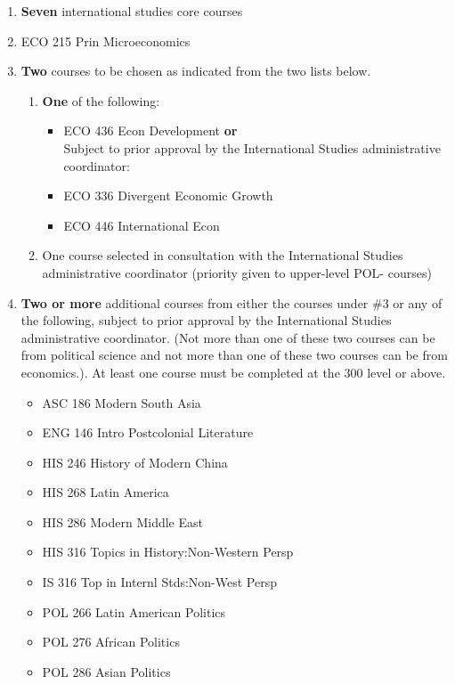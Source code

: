 \documentclass[
  letterpaper,
]{scrbook}
\providecommand{\tightlist}{%
  \setlength{\itemsep}{0pt}\setlength{\parskip}{0pt}}
\begin{document}
\begin{enumerate}
\def\labelenumi{\arabic{enumi}.}
\tightlist
\item
  \textbf{Seven} international studies core courses\\
\item
  ECO 215 Prin Microeconomics\\
\item
  \textbf{Two} courses to be chosen as indicated from the two lists
  below.

  \begin{enumerate}
  \def\labelenumii{\alph{enumii}.}
  \tightlist
  \item
    \textbf{One} of the following:

    \begin{itemize}
    \tightlist
    \item
      ECO 436 Econ Development \textbf{or}\\
      Subject to prior approval by the International Studies
      administrative coordinator:\\
    \item
      ECO 336 Divergent Economic Growth\\
    \item
      ECO 446 International Econ\\
    \end{itemize}
  \item
    One course selected in consultation with the International Studies
    administrative coordinator (priority given to upper-level POL-
    courses)\\
  \end{enumerate}
\item
  \textbf{Two or more} additional courses from either the courses under
  \#3 or any of the following, subject to prior approval by the
  International Studies administrative coordinator. (Not more than one
  of these two courses can be from political science and not more than
  one of these two courses can be from economics.). At least one course
  must be completed at the 300 level or above.

  \begin{itemize}
  \tightlist
  \item
    ASC 186 Modern South Asia
  \item
    ENG 146 Intro Postcolonial Literature
  \item
    HIS 246 History of Modern China
  \item
    HIS 268 Latin America
  \item
    HIS 286 Modern Middle East
  \item
    HIS 316 Topics in History:Non-Western Persp
  \item
    IS 316 Top in Internl Stds:Non-West Persp
  \item
    POL 266 Latin American Politics
  \item
    POL 276 African Politics
  \item
    POL 286 Asian Politics
  \end{itemize}
\end{enumerate}
\end{document}
